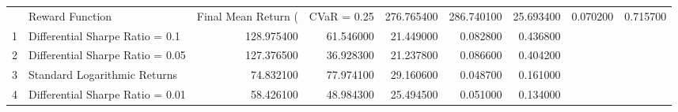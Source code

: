 \begin{tabular}{llrrrrr}
\toprule
 & Reward Function & Final Mean Return (%
 & CVaR = 0.25 & 276.765400 & 286.740100 & 25.693400 & 0.070200 & 0.715700 \\
1 & Differential Sharpe Ratio = 0.1 & 128.975400 & 61.546000 & 21.449000 & 0.082800 & 0.436800 \\
2 & Differential Sharpe Ratio = 0.05 & 127.376500 & 36.928300 & 21.237800 & 0.086600 & 0.404200 \\
3 & Standard Logarithmic Returns & 74.832100 & 77.974100 & 29.160600 & 0.048700 & 0.161000 \\
4 & Differential Sharpe Ratio = 0.01 & 58.426100 & 48.984300 & 25.494500 & 0.051000 & 0.134000 \\
\bottomrule
\end{tabular}
